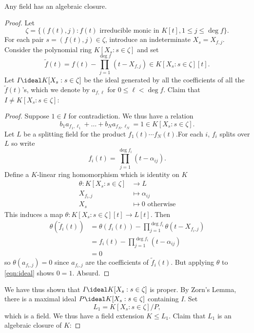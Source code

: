 \documentclass[a4paper]{article}
\begin{document}
\begin{theorem}
  Any field has an algebraic closure.
\end{theorem}

\begin{proof}
  Let
  \[
    \zeta = \{(f(t), j): f(t) \text{ irreducible monic in } K[t], 1 \leq j \leq \deg f \}.
  \]
  For each pair \(s = (f(t), j) \in \zeta\), introduce an indeterminate \(X_s = X_{f, j}\). Consider the polynomial ring \(K[X_s: s \in \zeta]\) and set
  \[
    \tilde f(t) = f(t) - \prod_{j = 1}^{\deg f} (t - X_{f, j}) \in K[X_s: s \in \zeta][t].
  \]
  Let \(I \ideal K[X_s: s \in \zeta]\) be the ideal generated by all the coefficients of all the \(\tilde f(t)\)'s, which we denote by \(a_{f, \ell}\) for \(0 \leq \ell < \deg f\). Claim that \(I \neq K[X_s: s \in \zeta]\):
  \begin{proof}
    Suppose \(1 \in I\) for contradiction. We thus have a relation
    \begin{equation*}
      \label{eqn:ideal}
      b_1 a_{f_1, \ell_1} + \dots + b_N a_{f_N, \ell_N} = 1 \in K[X_s: s \in \zeta].
      \tag{\(\ast\)}
    \end{equation*}
    Let \(L\) be a splitting field for the product \(f_1(t)\cdots f_N(t)\).For each \(i\), \(f_i\) splits over \(L\) so write
    \[
      f_i(t) = \prod_{j = 1}^{\deg f_i} (t - \alpha_{ij}).
    \]
    Define a \(K\)-linear ring homomorphism which is identity on \(K\)
    \begin{align*}
      \theta: K[X_s: s \in \zeta] &\to L \\
      X_{f_i, j} &\mapsto \alpha_{ij} \\
      X_s &\mapsto 0 \text{ otherwise}
    \end{align*}
    This induces a map \(\theta: K[X_s: s \in \zeta][t] \to L[t]\). Then
    \begin{align*}
      \theta(\tilde f_i(t)) &= \theta(f_i(t)) - \prod_{j = 1}^{\deg f_i} \theta(t - X_{f_i, j}) \\
                            &= f_i(t) - \prod_{j = 1}^{\deg f_i} (t - \alpha_{ij}) \\
                            &= 0
    \end{align*}
    so \(\theta(a_{f_i, j}) = 0\) since \(a_{f_i, j}\) are the coefficients of \(\tilde f_i(t)\). But applying \(\theta\) to \eqref{eqn:ideal} shows \(0 = 1\). Absurd.
  \end{proof}

  We have thus shown that \(I \ideal K[X_s: s \in \zeta]\) is proper. By Zorn's Lemma, there is a maximal ideal \(P \ideal K[X_s: s \in \zeta]\) containing \(I\). Set
  \[
    L_1 = K[X_s: s \in \zeta]/P,
  \]
  which is a field. We thus have a field extension \(K \leq L_1\). Claim that \(L_1\) is an algebraic closure of \(K\):


\end{proof}
\end{document}
